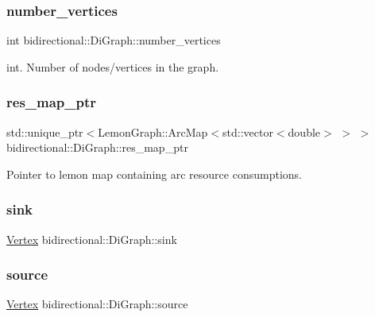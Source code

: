 \subsubsection{\texorpdfstring{number\+\_\+vertices}{number\_vertices}}
{\footnotesize\ttfamily int bidirectional\+::\+Di\+Graph\+::number\+\_\+vertices}



int. Number of nodes/vertices in the graph. 

\mbox{\label{classbidirectional_1_1DiGraph_acfed46f3f0adb003d0c90d713c1418cb}} 
\subsubsection{\texorpdfstring{res\+\_\+map\+\_\+ptr}{res\_map\_ptr}}
{\footnotesize\ttfamily std\+::unique\+\_\+ptr$<$Lemon\+Graph\+::\+Arc\+Map$<$std\+::vector$<$double$>$ $>$ $>$ bidirectional\+::\+Di\+Graph\+::res\+\_\+map\+\_\+ptr}



Pointer to lemon map containing arc resource consumptions. 

\mbox{\label{classbidirectional_1_1DiGraph_a11aab634efaff2bdbdbd77436d799206}} 
\subsubsection{\texorpdfstring{sink}{sink}}
{\footnotesize\ttfamily \hyperlink{structbidirectional_1_1Vertex}{Vertex} bidirectional\+::\+Di\+Graph\+::sink}

\mbox{\label{classbidirectional_1_1DiGraph_a8a790a14fd031fbe7a95fefe5f01fa0c}} 
\subsubsection{\texorpdfstring{source}{source}}
{\footnotesize\ttfamily \hyperlink{structbidirectional_1_1Vertex}{Vertex} bidirectional\+::\+Di\+Graph\+::source}



